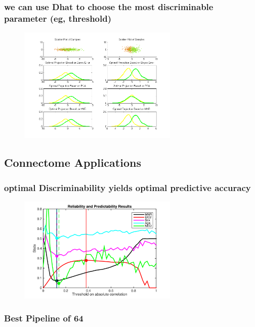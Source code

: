 \documentclass{article}
\begin{document}
\subsubsection{we can use Dhat to choose the most discriminable parameter (eg, threshold)}


\begin{figure}[t!]
\includegraphics[width=3.0in]{../Figs/parameter_selection_2sub.png}
\caption{}
\label{fig:64}
\end{figure}




\subsection{Connectome Applications}

\subsubsection{optimal Discriminability yields optimal predictive accuracy}

\begin{figure}[t!]
\includegraphics[width=3.0in]{../Figs/HCP.png}
\caption{}
\label{fig:64}
\end{figure}


\subsubsection{Best Pipeline of 64}
\end{document}
